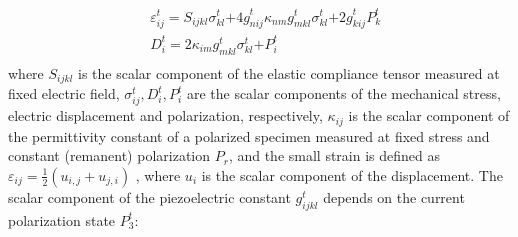 \begin{equation}
\begin{aligned}
&{ {\varepsilon }}_{{ {ij}}}^{ {t}}{ { = }}{{ {S}}_{{ {ijkl}}}}{ {\sigma }}_{{ {kl}}}^{ {t}}{ { + 4g}}_{{ {nij}}}^{ {t}}{{ {\kappa }}_{{ {nm}}}}{ {g}}_{{ {mkl}}}^{ {t}}{ {\sigma }}_{{ {kl}}}^{ {t}}{ { + 2 g}}_{{ {kij}}}^{ {t}}{ {P}}_{ {k}}^{ {t}} \\
&{ {D}}_{ {i}}^{ {t}}{ { = 2}}{{ {\kappa }}_{{ {im}}}}{ {g}}_{{ {mkl}}}^{ {t}}{ {\sigma }}_{{ {kl}}}^{ {t}}{ { + P}}_{ {i}}^{ {t}}\\
\end{aligned}
\label{EQN:3d_pol_constitutive_equation}
\end{equation}
where $S_{ijkl}$ is the scalar component of the elastic compliance tensor measured at fixed electric field,
$\sigma^t_{ij}, D^t_i, P^t_i$  are the scalar components of the mechanical stress,
 electric displacement and polarization, respectively,
 $\kappa_{ij}$  is the scalar component of the permittivity constant of a polarized specimen measured at fixed stress and constant (remanent) polarization
 $P_r$, and the small strain is defined as ${\varepsilon _{ij}} = \frac{1}{2}\left( {{u_{i,j}} + {u_{j,i}}} \right)$ , where $u_{i}$ is the scalar component of the displacement. The scalar component of the piezoelectric constant $g^t_{ijkl}$ depends on the current polarization state $P^t_3$:

